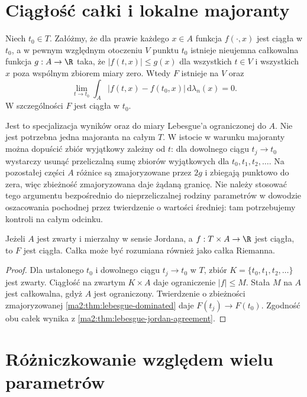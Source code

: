 \section{Ciągłość całki i lokalne majoranty}

\begin{twierdzenie}
\label{ma2:thm:parameter-continuity}
Niech $t_0\in T$. Załóżmy, że dla prawie każdego
$x\in A$ funkcja $f(\cdot,x)$ jest ciągła w $t_0$,
a w pewnym względnym otoczeniu $V$ punktu $t_0$
istnieje nieujemna całkowalna funkcja $g:A\to\R$
taka, że $|f(t,x)|\le g(x)$ dla wszystkich $t\in V$
i wszystkich $x$ poza wspólnym zbiorem miary zero.
Wtedy $F$ istnieje na $V$ oraz
\[
 \lim_{t\to t_0}\int_A |f(t,x)-f(t_0,x)|
 \,\mathrm d\lambda_n(x)=0.
\]
W szczególności $F$ jest ciągła w $t_0$.
\end{twierdzenie}
Jest to specjalizacja wyników
oraz
do miary Lebesgue'a ograniczonej do $A$.
Nie jest potrzebna jedna majoranta na całym $T$.
W istocie w warunku majoranty można dopuścić
zbiór wyjątkowy zależny od $t$: dla dowolnego
ciągu $t_j\to t_0$ wystarczy usunąć przeliczalną
sumę zbiorów wyjątkowych dla $t_0,t_1,t_2,\ldots$.
Na pozostałej części $A$ różnice są zmajoryzowane
przez $2g$ i zbiegają punktowo do zera, więc
zbieżność zmajoryzowana daje żądaną granicę.
Nie należy stosować tego argumentu bezpośrednio
do nieprzeliczalnej rodziny parametrów w dowodzie
oszacowania pochodnej przez twierdzenie o wartości
średniej: tam potrzebujemy kontroli na całym odcinku.

\begin{wniosek}
\label{ma2:cor:parameter-riemann-compact}
Jeżeli $A$ jest zwarty i mierzalny w sensie Jordana,
a $f:T\times A\to\R$ jest ciągła, to $F$ jest ciągła.
Całka może być rozumiana również jako całka Riemanna.
\end{wniosek}
\begin{proof}
Dla ustalonego $t_0$ i dowolnego ciągu $t_j\to t_0$
w $T$, zbiór $K=\{t_0,t_1,t_2,\ldots\}$ jest zwarty.
Ciągłość na zwartym $K\times A$ daje ograniczenie
$|f|\le M$. Stała $M$ na $A$ jest całkowalna,
gdyż $A$ jest ograniczony. Twierdzenie o zbieżności
zmajoryzowanej \ref{ma2:thm:lebesgue-dominated}
daje $F(t_j)\to F(t_0)$.
Zgodność obu całek wynika z
\ref{ma2:thm:lebesgue-jordan-agreement}.
\end{proof}

\section{Różniczkowanie względem wielu parametrów}

